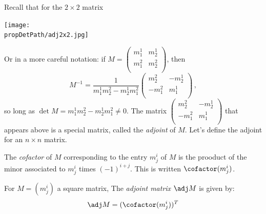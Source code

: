 Recall that for the $2\times 2$ matrix 
\begin{center}
\texttt{[image: \\propDetPath/adj2x2.jpg]}
\end{center}
Or in a more careful notation: if
$M=\begin{pmatrix}
m^1_1 & m^1_2 \\
m^2_1 & m^2_2 \\
\end{pmatrix}$, then \[M^{-1}=\frac{1}{m^1_1m^2_2-m^1_2m^2_1}\begin{pmatrix}
m^2_2 & -m^1_2 \\
-m^2_1 & m^1_1 \\
\end{pmatrix}\, ,\]
so long as $\det M=m^1_1m^2_2-m^1_2m^2_1\neq 0$.
  The  matrix $\begin{pmatrix}
m^2_2 & -m^1_2 \\
-m^2_1 & m^1_1 \\
\end{pmatrix}$ that appears above is a special matrix, called the \emph{adjoint} of $M$.  Let's define the adjoint for an $n \times n$ matrix.


The \emph{cofactor} of $M$ corresponding to the entry $m^i_j$ of $M$ 
is the prooduct of the minor associated to $m^i_j$
times $(-1)^{i+j}$.  This is written $\cofactor(m^i_j)$.

\begin{definition}
For $M=(m^i_j)$ a square matrix, The \emph{adjoint matrix} $\adj M$ is given by:
\[
\adj M = (\cofactor(m^i_j))^T
\]
\end{definition}

